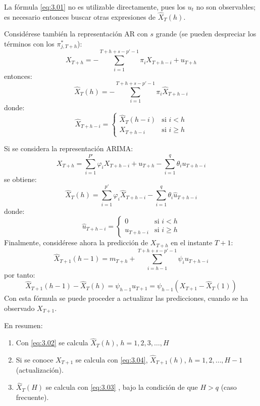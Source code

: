 La f\'{o}rmula \eqref{eq:3.01} no es utilizable directamente, pues los 
$u_{t}$ no son observables; es necesario entonces buscar otras 
expresiones de $\widehat{X} _{T} (h)$.

Consid\'{e}rese tambi\'{e}n la representaci\'{o}n AR con $s$ grande (se pueden 
despreciar los t\'{e}rminos con los $\pi^{\ast}_{j,T+h}$):
\[
X_{T+h} =-\sum_{i=1}^{T+h+s-p'-1} {\pi_{i} X_{T+h-i} +u_{T+h} } 
\]
entonces:
\begin{equation}
\label{eq:3.02}
 \widehat{X} _{T} (h)=-\sum_{i=1}^{T+h+s-p'-1} {\pi_{i} \widehat{X}_{T+h-i} } 
\end{equation}
donde: 
\[
\widehat{X}_{T+h-i} =\begin{cases}
                          \widehat{X} _{T} (h-i) & \text{si } i<h \\
                          X_{T+h-i} & \text{si } i\ge h
                         \end{cases}
\]

Si se considera la representaci\'{o}n ARIMA:
\[
X_{T+h} =\sum_{i=1}^{P'} {\varphi_{i} X_{T+h-i} +u_{T+h} -} 
\sum_{i=1}^q {\theta_{i} u_{T+h-i} } 
\]
se obtiene: 
\begin{equation}
\label{eq:3.03}
\widehat{X} _{T} (h)=\sum_{i=1}^{p'} {\varphi_{i} \widehat{X} _{T+h-i} -\sum_{i=1}^q {\theta_{i} \widehat{u} _{T+h-i} } } 
\end{equation}
donde: 
\[
\widehat{u}_{T+h-i} =\begin{cases}
                      0 &  \text{si } i<h \\ 
                      u_{T+h-i}&  \text{si } i\ge h
                     \end{cases}
\]
Finalmente, consid\'{e}rese ahora la predicci\'{o}n de $X_{{T+h}}$ en 
el instante $T+1$:
\[
\widehat{X}_{T+1} (h-1)=m_{T+h}+\sum_{i=h-1}^{T+h+s-p'-1} {\psi_{i} u_{T+h-i} } 
\]
por tanto:
\begin{equation}
\label{eq:3.04}
\widehat{X} _{T+1} (h-1)-\widehat{X}_{T} (h)=\psi_{h-1} u_{T+1} =\psi_{h-1} (X_{T+1} -\widehat{X}  _{T} (1))
\end{equation}
Con esta f\'{o}rmula se puede proceder a actualizar las predicciones, cuando 
se ha observado $X_{T+1} $.

En resumen:
\begin{enumerate}
\item Con \eqref{eq:3.02} se calcula $\widehat{X} _{T} (h)$, $h=1,2,3,\ldots,H$
\item Si se conoce $X_{{T+1}}$ se calcula con \eqref{eq:3.04}, $\widehat{X}_{T+1} (h)$, $h=1, 2,\ldots, H-1$ (actualizaci\'{o}n).
\item $\widehat{X} _{T} (H)$ se calcula con \eqref{eq:3.03} , bajo la condici\'{o}n de que $H > q$ (caso frecuente).
\end{enumerate}

